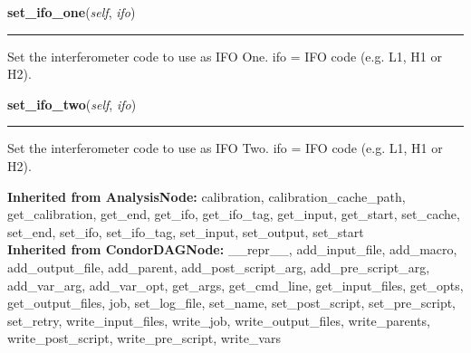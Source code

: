     \label{stochastic:StochasticNode:set_ifo_one}
    \vspace{0.5ex}

    \begin{boxedminipage}{\textwidth}

    \raggedright \textbf{set\_ifo\_one}(\textit{self}, \textit{ifo})

    \vspace{-1.5ex}

    \rule{\textwidth}{0.5\fboxrule}
    Set the interferometer code to use as IFO One. ifo = IFO code (e.g. 
    L1, H1 or H2).

    \vspace{1ex}

    \end{boxedminipage}

    \label{stochastic:StochasticNode:set_ifo_two}
    \vspace{0.5ex}

    \begin{boxedminipage}{\textwidth}

    \raggedright \textbf{set\_ifo\_two}(\textit{self}, \textit{ifo})

    \vspace{-1.5ex}

    \rule{\textwidth}{0.5\fboxrule}
    Set the interferometer code to use as IFO Two. ifo = IFO code (e.g. 
    L1, H1 or H2).

    \vspace{1ex}

    \end{boxedminipage}

  \textbf{Inherited from AnalysisNode:}
    calibration,
    calibration\_cache\_path,
    get\_calibration,
    get\_end,
    get\_ifo,
    get\_ifo\_tag,
    get\_input,
    get\_start,
    set\_cache,
    set\_end,
    set\_ifo,
    set\_ifo\_tag,
    set\_input,
    set\_output,
    set\_start
    \\
  \textbf{Inherited from CondorDAGNode:}
    \_\_repr\_\_,
    add\_input\_file,
    add\_macro,
    add\_output\_file,
    add\_parent,
    add\_post\_script\_arg,
    add\_pre\_script\_arg,
    add\_var\_arg,
    add\_var\_opt,
    get\_args,
    get\_cmd\_line,
    get\_input\_files,
    get\_opts,
    get\_output\_files,
    job,
    set\_log\_file,
    set\_name,
    set\_post\_script,
    set\_pre\_script,
    set\_retry,
    write\_input\_files,
    write\_job,
    write\_output\_files,
    write\_parents,
    write\_post\_script,
    write\_pre\_script,
    write\_vars
